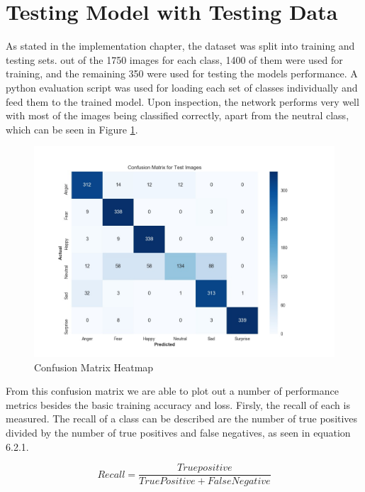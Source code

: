 \section{Testing Model with Testing Data}
As stated in the implementation chapter, the dataset was split into training and testing sets. out of the 1750 images for each class, 1400 of them were used for training, and the remaining 350 were used for testing the models performance. A python evaluation script was used for loading each set of classes individually and feed them to the trained model. Upon inspection, the network performs very well with most of the images being classified correctly, apart from the neutral class, which can be seen in Figure \ref{conf}.
\begin{figure}[ht]
	\begin{center}
		\advance\leftskip-3cm
		\advance\rightskip-3cm
		\includegraphics[keepaspectratio=true,scale=0.5]{__resources/Results/confusion.jpg}
		\caption{Confusion Matrix Heatmap}
		\label{conf}
	\end{center}
\end{figure}
\newpage

From this confusion matrix we are able to plot out a number of performance metrics besides the basic training accuracy and loss. Firsly, the recall of each is measured. The recall of a class can be described are the number of true positives divided by the number of true positives and false negatives, as seen in equation 6.2.1. 

\begin{equation}\label{eq:recall}
Recall = 
\frac{
True positive
}{
True Positive + False Negative
}
\end{equation}

